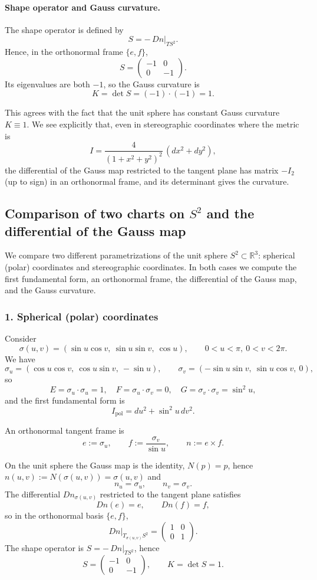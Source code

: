 \documentclass[12pt,a4paper]{article}
\theoremstyle{plain}
\theoremstyle{definition}      %
\begin{document}
\paragraph{Shape operator and Gauss curvature.}
The shape operator is defined by
\[
S = -\,Dn|_{T S^2}.
\]
Hence, in the orthonormal frame $\{e,f\}$,
\[
S
=
\begin{pmatrix}
	-1 & 0\\
	0 & -1
\end{pmatrix}.
\]
Its eigenvalues are both $-1$, so the Gauss curvature is
\[
K = \det S = (-1)\cdot(-1) = 1.
\]

This agrees with the fact that the unit sphere has constant Gauss curvature
$K \equiv 1$.  We see explicitly that, even in stereographic coordinates where
the metric is
\[
I = \frac{4}{(1 + x^2 + y^2)^2}\,(dx^2 + dy^2),
\]
the differential of the Gauss map restricted to the tangent plane has
matrix $-I_{2}$ (up to sign) in an orthonormal frame, and its determinant
gives the curvature.

\subsection*{Comparison of two charts on $S^2$ and the differential of the Gauss map}

We compare two different parametrizations of the unit sphere $S^2\subset\mathbb{R}^3$:
spherical (polar) coordinates and stereographic coordinates.  In both cases we
compute the first fundamental form, an orthonormal frame, the differential of
the Gauss map, and the Gauss curvature.

\subsubsection*{1. Spherical (polar) coordinates}

Consider
\[
\sigma(u,v) = (\sin u\cos v,\ \sin u\sin v,\ \cos u),
\qquad 0<u<\pi,\ 0<v<2\pi.
\]
We have
\[
\sigma_u = (\cos u\cos v,\ \cos u\sin v,\ -\sin u),\qquad
\sigma_v = (-\sin u\sin v,\ \sin u\cos v,\ 0),
\]
so
\[
E = \sigma_u\cdot\sigma_u = 1,\quad
F = \sigma_u\cdot\sigma_v = 0,\quad
G = \sigma_v\cdot\sigma_v = \sin^2 u,
\]
and the first fundamental form is
\[
I_{\mathrm{pol}} = du^2 + \sin^2 u\,dv^2.
\]

An orthonormal tangent frame is
\[
e := \sigma_u,\qquad
f := \frac{\sigma_v}{\sin u},\qquad
n := e\times f.
\]

On the unit sphere the Gauss map is the identity,
$N(p)=p$, hence $n(u,v):=N(\sigma(u,v))=\sigma(u,v)$ and
\[
n_u = \sigma_u,\qquad n_v = \sigma_v.
\]
The differential $Dn_{\sigma(u,v)}$ restricted to the tangent plane satisfies
\[
Dn(e) = e,\qquad Dn(f) = f,
\]
so in the orthonormal basis $\{e,f\}$,
\[
Dn|_{T_{\sigma(u,v)}S^2}
=
\begin{pmatrix}
	1 & 0\\
	0 & 1
\end{pmatrix}.
\]
The shape operator is $S=-\,Dn|_{T S^2}$, hence
\[
S =
\begin{pmatrix}
	-1 & 0\\
	0 & -1
\end{pmatrix},
\qquad
K = \det S = 1.
\]
\end{document}
